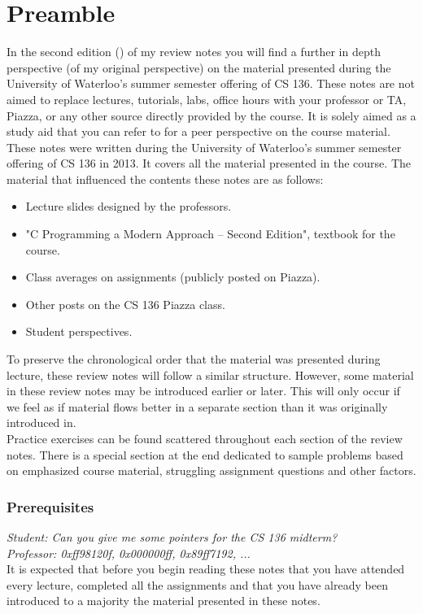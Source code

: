 \section*{Preamble}

In the second edition (\docbuild) of my review notes you will find a further in depth perspective (of my original perspective) on the material presented during the University of Waterloo's summer semester offering of CS 136. These notes are not aimed to replace lectures, tutorials, labs, office hours with your professor or TA, Piazza, or any other source directly provided by the course. It is solely aimed as a study aid that you can refer to for a peer perspective on the course material.\\

These notes were written during the University of Waterloo's summer semester offering of CS 136 in 2013. It covers all the material presented in the course. The material that influenced the contents these notes are as follows:

\begin{itemize}

\item Lecture slides designed by the professors.
\item "C Programming a Modern Approach -- Second Edition", textbook for the course.
\item Class averages on assignments (publicly posted on Piazza).
\item Other posts on the CS 136 Piazza class.
\item Student perspectives.

\end{itemize}

To preserve the chronological order that the material was presented during lecture, these review notes will follow a similar structure. However, some material in these review notes may be introduced earlier or later. This will only occur if we feel as if material flows better in a separate section than it was originally introduced in.\\

Practice exercises can be found scattered throughout each section of the review notes. There is a special section at the end dedicated to sample problems based on emphasized course material, struggling assignment questions and other factors.

\subsubsection*{Prerequisites}

\textit{Student: Can you give me some pointers for the CS 136 midterm?}\\
\textit{Professor: 0xff98120f, 0x000000ff, 0x89ff7192, ...}\\

It is expected that before you begin reading these notes that you have attended every lecture, completed all the assignments and that you have already been introduced to a majority the material presented in these notes.
